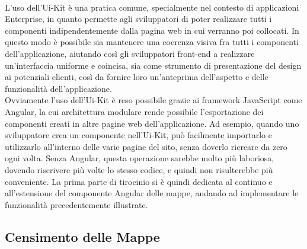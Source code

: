 \\L'uso dell'Ui-Kit è una pratica comune, specialmente nel contesto di applicazioni Enterprise, in quanto permette agli sviluppatori di poter realizzare tutti i componenti indipendentemente dalla pagina web in cui verranno poi collocati. In questo modo è possibile sia mantenere una coerenza visiva fra tutti i componenti dell'applicazione, aiutando così gli sviluppatori front-end a realizzare un'interfaccia uniforme e coincisa, sia come strumento di presentazione del design ai potenziali clienti, così da fornire loro un'anteprima dell'aspetto e delle funzionalità dell'applicazione.
\\Ovviamente l'uso dell'Ui-Kit è reso possibile grazie ai framework JavaScript come Angular, la cui architettura modulare rende possibile l'esportazione dei componenti creati in altre pagine web dell'applicazione. Ad esempio, quando uno sviluppatore crea un componente nell'Ui-Kit, può facilmente importarlo e utilizzarlo all'interno delle varie pagine del sito, senza doverlo ricreare da zero ogni volta. Senza Angular, questa operazione sarebbe molto più laboriosa, dovendo riscrivere più volte lo stesso codice, e quindi non risulterebbe più conveniente. La prima parte di tirocinio si è quindi dedicata al continuo e all'estensione del componente Angular delle mappe, andando ad implementare le funzionalità precedentemente illustrate.

\subsection*{Censimento delle Mappe}

